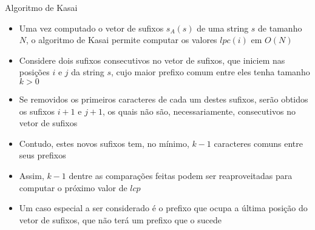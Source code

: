 \begin{frame}[fragile]{Algoritmo de Kasai}

    \begin{itemize}
        \item Uma vez computado o vetor de sufixos $s_A(s)$ de uma string $s$ de tamanho $N$,
            o algoritmo de Kasai permite computar os valores $lpc(i)$ em $O(N)$

        \item Considere dois sufixos consecutivos no vetor de sufixos, que iniciem nas posições
            $i$ e $j$ da string $s$, cujo maior prefixo comum entre eles tenha tamanho $k > 0$

        \item Se removidos os primeiros caracteres de cada um destes
            sufixos, serão obtidos os sufixos $i + 1$ e $j + 1$, os quais não são, 
            necessariamente, consecutivos no vetor de sufixos

        \item Contudo, estes novos sufixos tem, no mínimo, $k - 1$ caracteres comuns entre 
            seus prefixos

        \item Assim, $k - 1$ dentre as comparações feitas podem ser reaproveitadas para computar
            o próximo valor de $lcp$

        \item Um caso especial a ser considerado é o prefixo que ocupa a última posição
            do vetor de sufixos, que não terá um prefixo que o sucede
    \end{itemize}

\end{frame}


